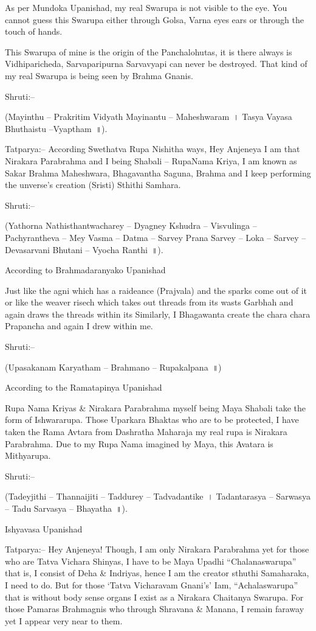 As per Mundoka Upanishad, my real Swarupa is not visible to the eye. You cannot guess this Swarupa either through Golsa, Varna eyes ears or through the touch of hands.

This Swarupa of mine is the origin of the Panchalohutas, it is there always is Vidhiparicheda, Sarvaparipurna Sarvavyapi can never be destroyed. That kind of my real Swarupa is being seen by Brahma Gnanis.

Shruti:–

(Mayinthu – Prakritim Vidyath Mayinantu – Maheshwaram~। Tasya Vayasa Bhuthaistu –Vyaptham~॥).

Tatparya:– According Swethatva Rupa Nishitha ways, Hey Anjeneya I am that Nirakara Parabrahma and I being Shabali – RupaNama Kriya, I am known as Sakar Brahma Maheshwara, Bhagavantha Saguna, Brahma and I keep performing the unverse's creation (Sristi) Sthithi Samhara.

Shruti:–

(Yathorna Nathisthantwacharey – Dyagney Kshudra – Visvulinga – Pachyrantheva – Mey Vasma – Datma – Sarvey Prana Sarvey – Loka – Sarvey – Devasarvani Bhutani – Vyocha Ranthi~॥).

According to Brahmadaranyako Upanishad

Just like the agni which has a raideance (Prajvala) and the sparks come out of it or like the weaver risech which takes out threads from its wasts Garbhah and again draws the threads within its Similarly, I Bhagawanta create the chara chara Prapancha and again I drew within me.

Shruti:–

(Upasakanam Karyatham – Brahmano – Rupakalpana~॥)

According to the Ramatapinya Upanishad

Rupa Nama Kriyas \& Nirakara Parabrahma myself being Maya Shabali take the form of Ishwararupa. Those Uparkara Bhaktas who are to be protected, I have taken the Rama Avtara from Dashratha Maharaja my real rupa is Nirakara Parabrahma. Due to my Rupa Nama imagined by Maya, this Avatara is Mithyarupa.

Shruti:–

(Tadeyjithi – Thannaijiti – Taddurey – Tadvadantike~। Tadantarasya – Sarwasya – Tadu Sarvasya – Bhayatha~॥).

Ishyavasa Upanishad

Tatparya:– Hey Anjeneya! Though, I am only Nirakara Parabrahma yet for those who are Tatva Vichara Shinyas, I have to be Maya Upadhi “Chalanaswarupa” that is, I consist of Deha \& Indriyas, hence I am the creator sthuthi Samaharaka, I need to do. But for those ‘Tatva Vicharavam Gnani's’ Iam, “Achalaswarupa” that is without body sense organs I exist as a Nirakara Chaitanya Swarupa. For those Pamaras Brahmagnis who through Shravana \& Manana, I remain faraway yet I appear very near to them.

